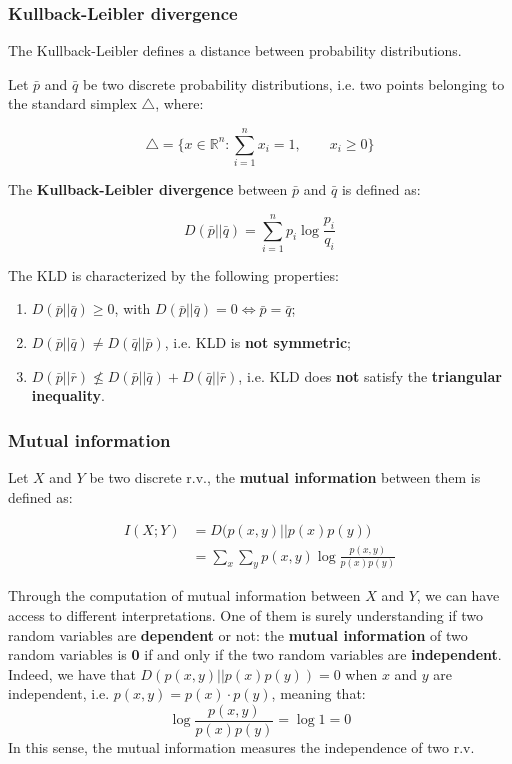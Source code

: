\subsubsection{Kullback-Leibler divergence}

The Kullback-Leibler defines a distance between probability distributions. 

Let $\bar{p}$ and $\bar{q}$ be two discrete probability distributions, i.e. two points belonging to the standard simplex $\bigtriangleup$, where:

$$
\bigtriangleup = \{ x \in \mathbb{R}^n : \sum_{i = 1}^n x_i = 1, \qquad x_i \geq 0 \}
$$


The \textbf{Kullback-Leibler divergence} between $\bar{p}$ and $\bar{q}$ is defined as:

$$
D(\bar{p} || \bar{q}) = \sum_{i=1}^n p_i \log \frac{p_i}{q_i}
$$

The KLD is characterized by the following properties:

\begin{enumerate}
    \item $D(\bar{p} || \bar{q}) \geq 0$, with $D(\bar{p} || \bar{q}) = 0 \iff \bar{p} = \bar{q}$;
    \item $D(\bar{p} || \bar{q}) \neq D(\bar{q} || \bar{p})$, i.e. KLD is \textbf{not symmetric};
    \item $D(\bar{p} || \bar{r}) \nleq D(\bar{p} || \bar{q}) + D(\bar{q} || \bar{r})$, i.e. KLD does \textbf{not} satisfy the \textbf{triangular inequality}.
\end{enumerate}

\subsubsection{Mutual information}
Let $X$ and $Y$ be two discrete r.v., the \textbf{mutual information} between them is defined as:

\begin{equation*}
\begin{split}
I(X;Y) &= D \big( p(x,y)||p(x)p(y) \big)\\
&=\sum_x \sum_y p(x,y) \log \frac{p(x,y)}{p(x)p(y)}
\end{split}
\end{equation*}

Through the computation of mutual information between $X$ and $Y$, we can have access to different interpretations. One of them is surely understanding if two random variables are \textbf{dependent} or not: the \textbf{mutual information} of two random variables is \textbf{0} if and only if the two random variables are \textbf{independent}. Indeed, we have that $D(p(x,y)||p(x)p(y)) = 0$ when $x$ and $y$ are independent, i.e. $p(x,y) = p(x)\cdot p(y)$, meaning that: 
$$\log \frac{p(x,y)}{p(x)p(y)} = \log 1 = 0 $$
In this sense, the mutual information measures the independence of two r.v.

